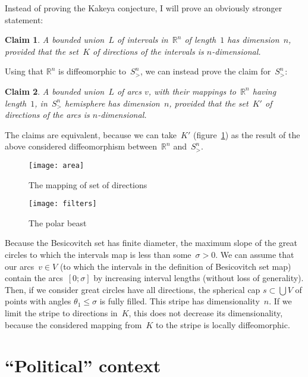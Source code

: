 \documentclass[oneside,draft]{amsart}
\newtheorem{claim}{Claim}
\begin{document}
Instead of proving the Kakeya conjecture, I will prove an obviously stronger statement:

\begin{claim}
A bounded union~$L$ of intervals in~$\mathbb{R}^n$ of length~$1$ has dimension~$n$, provided that the set~$K$ of directions of the intervals is $n$-di\-men\-sio\-nal.
\end{claim}

Using that $\mathbb{R}^n$ is diffeomorphic to~$S^n_{>}$, we can instead prove the claim for~$S^n_{>}$:

\begin{claim}
A bounded union~$L$ of arcs $v$, with their mappings to~$\mathbb{R}^n$ having length~$1$, in~$S^n_{>}$ hemisphere has dimension~$n$, provided that the set~$K'$ of directions of the arcs is $n$-di\-men\-sio\-nal.
\end{claim}

The claims are equivalent, because we can take~$K'$ (figure~\ref{fig:area}) as the result of the above considered diffeomorphism between~$\mathbb{R}^n$ and~$S^n_{>}$.

\begin{figure}[hbt]
    \centering
    \texttt{[image: area]}
    \caption{The mapping of set of directions}
    \label{fig:area}
\end{figure}

\begin{figure}[hbt]
    \centering
    \texttt{[image: filters]}
    \caption{The polar beast}
    \label{fig:filters}
\end{figure}

Because the Besicovitch set has finite diameter, the maximum slope of the great circles to which the intervals map is less than some~$\sigma>0$. We can assume that our arcs~$v\in V$ (to which the intervals in the definition of Besicovitch set map) contain the arcs~$[0;\sigma]$ by increasing interval lengths (without loss of generality). Then, if we consider great circles have all directions, the spherical cap $s\subset\bigcup V$ of points with angles $\theta_1\leq\sigma$ is fully filled. This stripe has dimensionality~$n$.
If we limit the stripe to directions in~$K$, this does not decrease its dimensionality, because the considered mapping from~$K$ to the stripe is locally diffeomorphic.

\section{``Political'' context}
\end{document}
